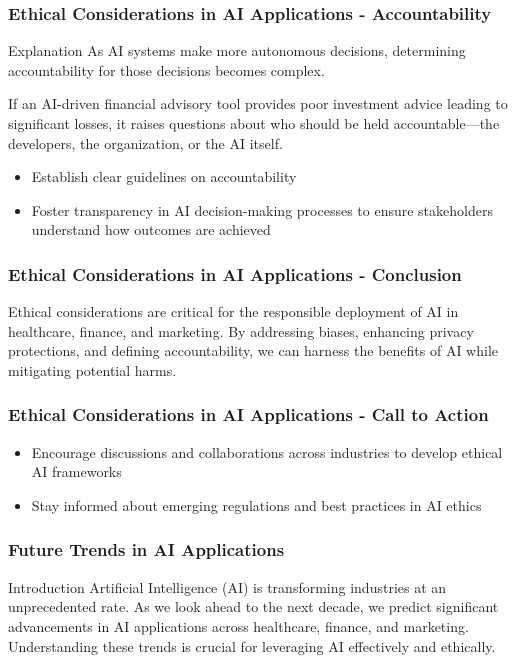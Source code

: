 \documentclass{beamer}
\begin{document}
\begin{frame}[fragile]
    \frametitle{Ethical Considerations in AI Applications - Accountability}
    \begin{block}{Explanation}
        As AI systems make more autonomous decisions, determining accountability for those decisions becomes complex. 
    \end{block}
    \begin{example}
        If an AI-driven financial advisory tool provides poor investment advice leading to significant losses, it raises questions about who should be held accountable—the developers, the organization, or the AI itself.
    \end{example}

    \begin{itemize}
        \item Establish clear guidelines on accountability
        \item Foster transparency in AI decision-making processes to ensure stakeholders understand how outcomes are achieved
    \end{itemize}
\end{frame}

\begin{frame}[fragile]
    \frametitle{Ethical Considerations in AI Applications - Conclusion}
    Ethical considerations are critical for the responsible deployment of AI in healthcare, finance, and marketing. By addressing biases, enhancing privacy protections, and defining accountability, we can harness the benefits of AI while mitigating potential harms.
\end{frame}

\begin{frame}[fragile]
    \frametitle{Ethical Considerations in AI Applications - Call to Action}
    \begin{itemize}
        \item Encourage discussions and collaborations across industries to develop ethical AI frameworks
        \item Stay informed about emerging regulations and best practices in AI ethics
    \end{itemize}
\end{frame}

\begin{frame}[fragile]
    \frametitle{Future Trends in AI Applications}
    
    \begin{block}{Introduction}
        Artificial Intelligence (AI) is transforming industries at an unprecedented rate. As we look ahead to the next decade, we predict significant advancements in AI applications across healthcare, finance, and marketing. Understanding these trends is crucial for leveraging AI effectively and ethically.
    \end{block}
\end{frame}
\end{document}
